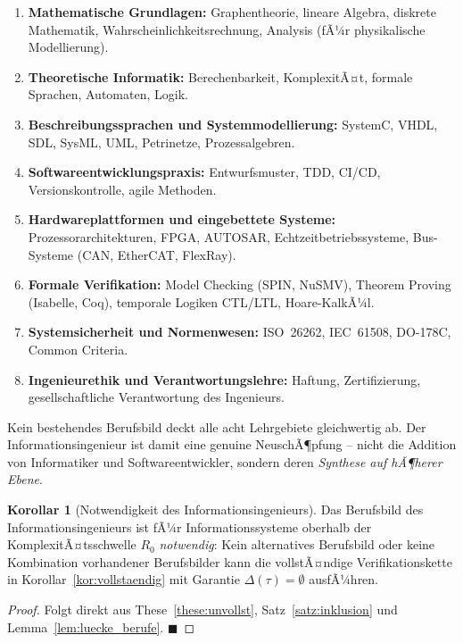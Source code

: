 ﻿\documentclass[a4paper,12pt]{article}
\theoremstyle{definition}
\newtheorem{korollar}{Korollar}
\begin{document}
\begin{enumerate}
  \item \textbf{Mathematische Grundlagen:}
        Graphentheorie, lineare Algebra, diskrete Mathematik, Wahrscheinlichkeitsrechnung,
        Analysis (fÃ¼r physikalische Modellierung).
  \item \textbf{Theoretische Informatik:}
        Berechenbarkeit, KomplexitÃ¤t, formale Sprachen, Automaten, Logik.
  \item \textbf{Beschreibungssprachen und Systemmodellierung:}
        SystemC, VHDL, SDL, SysML, UML, Petrinetze, Prozessalgebren.
  \item \textbf{Softwareentwicklungspraxis:}
        Entwurfsmuster, TDD, CI/CD, Versionskontrolle, agile Methoden.
  \item \textbf{Hardwareplattformen und eingebettete Systeme:}
        Prozessorarchitekturen, FPGA, AUTOSAR, Echtzeitbetriebssysteme,
        Bus-Systeme (CAN, EtherCAT, FlexRay).
  \item \textbf{Formale Verifikation:}
        Model Checking (SPIN, NuSMV), Theorem Proving (Isabelle, Coq),
        temporale Logiken CTL/LTL, Hoare-KalkÃ¼l.
  \item \textbf{Systemsicherheit und Normenwesen:}
        ISO~26262, IEC~61508, DO-178C, Common Criteria.
  \item \textbf{Ingenieurethik und Verantwortungslehre:}
        Haftung, Zertifizierung, gesellschaftliche Verantwortung des Ingenieurs.
\end{enumerate}

Kein bestehendes Berufsbild deckt alle acht Lehrgebiete gleichwertig ab.
Der Informationsingenieur ist damit eine genuine NeuschÃ¶pfung -- nicht die Addition
von Informatiker und Softwareentwickler, sondern deren \emph{Synthese auf
hÃ¶herer Ebene}.

\begin{korollar}[Notwendigkeit des Informationsingenieurs]
\label{kor:notwendigkeit}
Das Berufsbild des Informationsingenieurs ist fÃ¼r Informationssysteme oberhalb der
KomplexitÃ¤tsschwelle $R_0$ \emph{notwendig}: Kein alternatives Berufsbild oder keine
Kombination vorhandener Berufsbilder kann die vollstÃ¤ndige Verifikationskette in
Korollar~\ref{kor:vollstaendig} mit Garantie $\Delta(\tau) = \emptyset$ ausfÃ¼hren.
\end{korollar}

\begin{proof}
Folgt direkt aus These~\ref{these:unvollst}, Satz~\ref{satz:inklusion}
und Lemma~\ref{lem:luecke_berufe}. $\blacksquare$
\end{proof}
\end{document}
